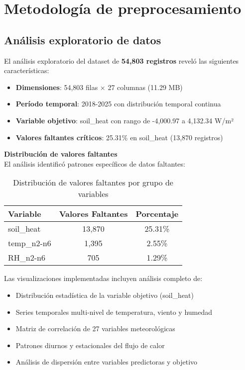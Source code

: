 
\section{Metodología de preprocesamiento}

\subsection{Análisis exploratorio de datos}
El análisis exploratorio del dataset de \textbf{54,803 registros} reveló las
siguientes características:

\begin{itemize}
    \item \textbf{Dimensiones}: 54,803 filas × 27 columnas (11.29 MB)
    \item \textbf{Período temporal}: 2018-2025 con distribución temporal continua
    \item \textbf{Variable objetivo}: soil\_heat con rango de -4,000.97 a 4,132.34 W/m²
    \item \textbf{Valores faltantes críticos}: 25.31\% en soil\_heat (13,870 registros)
\end{itemize}

\noindent\textbf{Distribución de valores faltantes}\\
El análisis identificó patrones específicos de datos faltantes:

\begin{table}[h]
\centering
\begin{tabular}{|l|c|c|}
\hline
\textbf{Variable} & \textbf{Valores Faltantes} & \textbf{Porcentaje} \\
\hline
soil\_heat & 13,870 & 25.31\% \\
temp\_n2-n6 & 1,395 & 2.55\% \\
RH\_n2-n6 & 705 & 1.29\% \\
\hline
\end{tabular}
\caption{Distribución de valores faltantes por grupo de variables}
\end{table}

Las visualizaciones implementadas incluyen análisis completo de:
\begin{itemize}
    \item Distribución estadística de la variable objetivo (soil\_heat)
    \item Series temporales multi-nivel de temperatura, viento y humedad
    \item Matriz de correlación de 27 variables meteorológicas
    \item Patrones diurnos y estacionales del flujo de calor
    \item Análisis de dispersión entre variables predictoras y objetivo
\end{itemize}

